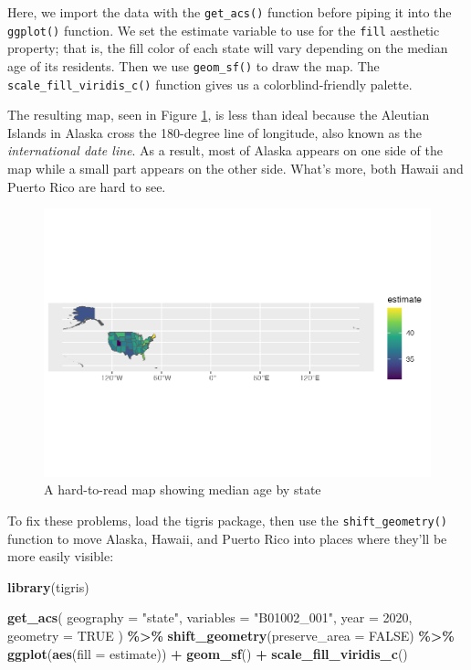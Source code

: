 \documentclass[
]{book}
\newenvironment{Shaded}{\begin{snugshade}}{\end{snugshade}}
\newcommand{\AttributeTok}[1]{\textcolor[rgb]{0.13,0.29,0.53}{#1}}
\newcommand{\ConstantTok}[1]{\textcolor[rgb]{0.56,0.35,0.01}{#1}}
\newcommand{\DecValTok}[1]{\textcolor[rgb]{0.00,0.00,0.81}{#1}}
\newcommand{\FunctionTok}[1]{\textcolor[rgb]{0.13,0.29,0.53}{\textbf{#1}}}
\newcommand{\NormalTok}[1]{#1}
\newcommand{\SpecialCharTok}[1]{\textcolor[rgb]{0.81,0.36,0.00}{\textbf{#1}}}
\newcommand{\StringTok}[1]{\textcolor[rgb]{0.31,0.60,0.02}{#1}}
\begin{document}
Here, we import the data with the \texttt{get\_acs()} function before piping it into the \texttt{ggplot()} function. We set the estimate variable to use for the \texttt{fill} aesthetic property; that is, the fill color of each state will vary depending on the median age of its residents. Then we use \texttt{geom\_sf()} to draw the map. The \texttt{scale\_fill\_viridis\_c()} function gives us a colorblind-friendly palette.

The resulting map, seen in Figure \ref{fig:median-age-map-bad}, is less than ideal because the Aleutian Islands in Alaska cross the 180-degree line of longitude, also known as the \emph{international date line}. As a result, most of Alaska appears on one side of the map while a small part appears on the other side. What's more, both Hawaii and Puerto Rico are hard to see.

\begin{figure}
\includegraphics[width=1\linewidth]{accessing-data_files/figure-latex/median-age-map-bad-1} \caption{A hard-to-read map showing median age by state}\label{fig:median-age-map-bad}
\end{figure}

To fix these problems, load the tigris package, then use the \texttt{shift\_geometry()} function to move Alaska, Hawaii, and Puerto Rico into places where they'll be more easily visible:

\begin{Shaded}
\begin{Highlighting}[]
\FunctionTok{library}\NormalTok{(tigris)}

\FunctionTok{get\_acs}\NormalTok{(}
  \AttributeTok{geography =} \StringTok{"state"}\NormalTok{,}
  \AttributeTok{variables =} \StringTok{"B01002\_001"}\NormalTok{,}
  \AttributeTok{year =} \DecValTok{2020}\NormalTok{,}
  \AttributeTok{geometry =} \ConstantTok{TRUE}
\NormalTok{) }\SpecialCharTok{\%\textgreater{}\%}
  \FunctionTok{shift\_geometry}\NormalTok{(}\AttributeTok{preserve\_area =} \ConstantTok{FALSE}\NormalTok{) }\SpecialCharTok{\%\textgreater{}\%}
  \FunctionTok{ggplot}\NormalTok{(}\FunctionTok{aes}\NormalTok{(}\AttributeTok{fill =}\NormalTok{ estimate)) }\SpecialCharTok{+}
  \FunctionTok{geom\_sf}\NormalTok{() }\SpecialCharTok{+}
  \FunctionTok{scale\_fill\_viridis\_c}\NormalTok{()}
\end{Highlighting}
\end{Shaded}
\end{document}
